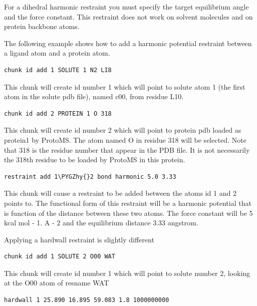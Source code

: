\documentclass[letterpaper,10pt,english]{sphinxmanual}
\def\PYGZhy{\char`\-}
\begin{document}
For a dihedral harmonic restraint you must specify the target equilibrium angle and the force constant. This restraint does not work on solvent molecules and on protein backbone atoms.

The following example shows how to add a harmonic potential restraint between a ligand atom and a protein atom.

\begin{Verbatim}[frame=single,commandchars=\\\{\}]
chunk id add 1 SOLUTE 1 N2 LI8
\end{Verbatim}

This chunk will create id number 1 which will point to solute atom 1 (the first atom in the solute pdb file), named c00, from residue L10.

\begin{Verbatim}[frame=single,commandchars=\\\{\}]
chunk id add 2 PROTEIN 1 O 318
\end{Verbatim}

This chunk will create id number 2 which will point to protein pdb loaded as protein1 by ProtoMS. The atom named O in residue 318 will be selected. Note that 318 is the residue number that appear in the PDB file. It is not necessarily the 318th residue to be loaded by ProtoMS in this protein.

\begin{Verbatim}[frame=single,commandchars=\\\{\}]
restraint add 1\PYGZhy{}2 bond harmonic 5.0 3.33
\end{Verbatim}

This chunk will cause a restraint to be added between the atoms id 1 and 2 points to. The functional form of this restraint will be a harmonic potential that is function of the distance between these two atoms. The force constant will be 5 kcal mol - 1. A - 2 and the equilibrium distance 3.33 angstrom.

Applying a hardwall restraint is slightly different

\begin{Verbatim}[frame=single,commandchars=\\\{\}]
chunk id add 1 SOLUTE 2 O00 WAT
\end{Verbatim}

This chunk will create id number 1 which will point to solute number 2, looking at the O00 atom of resname WAT

\begin{Verbatim}[frame=single,commandchars=\\\{\}]
hardwall 1 25.890 16.895 59.083 1.8 1000000000
\end{Verbatim}
\end{document}
